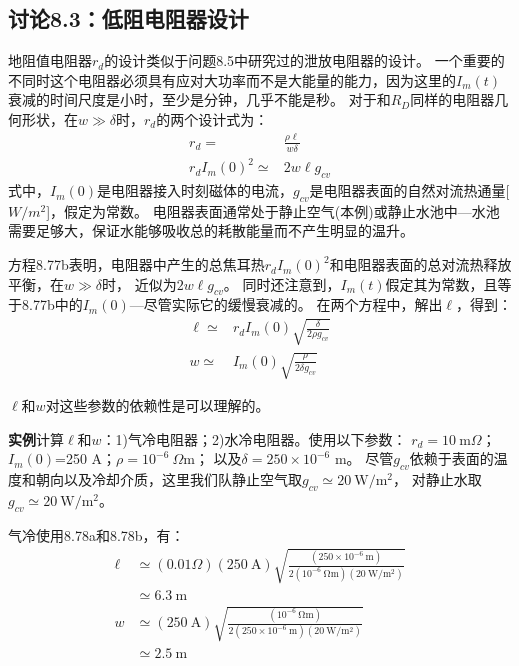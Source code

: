 \subsection{讨论8.3：低阻电阻器设计}
地阻值电阻器$r_d$的设计类似于问题8.5中研究过的泄放电阻器的设计。
一个重要的不同时这个电阻器必须具有应对大功率而不是大能量的能力，因为这里的$I_m(t)$
衰减的时间尺度是小时，至少是分钟，几乎不能是秒。
对于和$R_D$同样的电阻器几何形状，在$w\gg \delta$时，$r_d$的两个设计式为：
\begin{subequations}
	\begin{align}
r_d=&\frac{\rho\ell}{w\delta}\\
r_dI_m(0)^2\simeq& 2w\ell g_{cv}
	\end{align}
\end{subequations}
式中，$I_m(0)$是电阻器接入时刻磁体的电流，$g_{cv}$是电阻器表面的自然对流热通量[$W/m^2$]，假定为常数。
电阻器表面通常处于静止空气(本例)或静止水池中---水池需要足够大，保证水能够吸收总的耗散能量而不产生明显的温升。

方程8.77b表明，电阻器中产生的总焦耳热$r_d I_m(0)^2$和电阻器表面的总对流热释放平衡，在$w\gg \delta$时，
近似为$2w\ell g_{cv}$。
同时还注意到，$I_m(t)$假定其为常数，且等于8.77b中的$I_m(0)$---尽管实际它的缓慢衰减的。
在两个方程中，解出$\ell$，得到：
\begin{subequations}
	\begin{align}
\ell\simeq& r_dI_m(0)\sqrt{\frac{\delta}{2\rho g_{cv}}}\\
w\simeq& I_m(0)\sqrt{\frac{\rho}{2\delta g_{cv}}}
	\end{align}
\end{subequations}

$\ell$和$w$对这些参数的依赖性是可以理解的。

\textbf{实例}\qquad 计算$\ell$和$w$：1)气冷电阻器；2)水冷电阻器。使用以下参数：
$r_d=10\ \mathrm{m}\Omega$；$I_m(0)$=250 A；$\rho=10^{-6}\ \Omega$m；
以及$\delta=250\times 10^{-6}$ m。
尽管$g_{cv}$依赖于表面的温度和朝向以及冷却介质，这里我们队静止空气取$g_{cv}\simeq 20\ \mathrm{W/m^2}$，
对静止水取$g_{cv}\simeq 20\ \mathrm{W/m^2}$。

气冷\qquad 使用8.78a和8.78b，有：
\begin{align*}%
\ell&\simeq(0.01\Omega)(250\ \mathrm{A})\sqrt{\frac{(250\times 10^{-6}\ \mathrm{m})}{2(10^{-6}\ \mathrm{\Omega m})(20\ \mathrm{W/m^2})}} \\
&\simeq 6.3\ \mathrm{m}\\
w&\simeq(250\ \mathrm{A})\sqrt{\frac{(10^{-6}\ \mathrm{\Omega m})}{2(250\times 10^{-6}\ \mathrm{m})(20\ \mathrm{W/m^2})}} \\
&\simeq 2.5\ \mathrm{m}
\end{align*}


